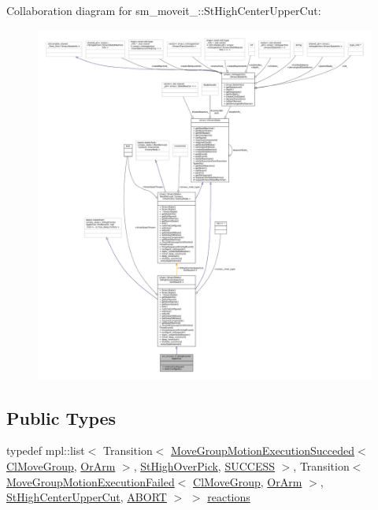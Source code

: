 Collaboration diagram for sm\+\_\+moveit\+\_\+:\+:St\+High\+Center\+Upper\+Cut\+:
\nopagebreak
\begin{figure}[H]
\begin{center}
\leavevmode
\includegraphics[width=350pt]{structsm__moveit__3_1_1StHighCenterUpperCut__coll__graph}
\end{center}
\end{figure}
\subsection*{Public Types}
\begin{DoxyCompactItemize}
\item 
typedef mpl\+::list$<$ Transition$<$ \hyperlink{structmoveit__z__client_1_1MoveGroupMotionExecutionSucceded}{Move\+Group\+Motion\+Execution\+Succeded}$<$ \hyperlink{classmoveit__z__client_1_1ClMoveGroup}{Cl\+Move\+Group}, \hyperlink{classsm__moveit__3_1_1OrArm}{Or\+Arm} $>$, \hyperlink{structsm__moveit__3_1_1StHighOverPick}{St\+High\+Over\+Pick}, \hyperlink{classSUCCESS}{S\+U\+C\+C\+E\+SS} $>$, Transition$<$ \hyperlink{structmoveit__z__client_1_1MoveGroupMotionExecutionFailed}{Move\+Group\+Motion\+Execution\+Failed}$<$ \hyperlink{classmoveit__z__client_1_1ClMoveGroup}{Cl\+Move\+Group}, \hyperlink{classsm__moveit__3_1_1OrArm}{Or\+Arm} $>$, \hyperlink{structsm__moveit__3_1_1StHighCenterUpperCut}{St\+High\+Center\+Upper\+Cut}, \hyperlink{classABORT}{A\+B\+O\+RT} $>$ $>$ \hyperlink{structsm__moveit__3_1_1StHighCenterUpperCut_a4985c365500d6acc2991ecf20c4476e7}{reactions}
\end{DoxyCompactItemize}
